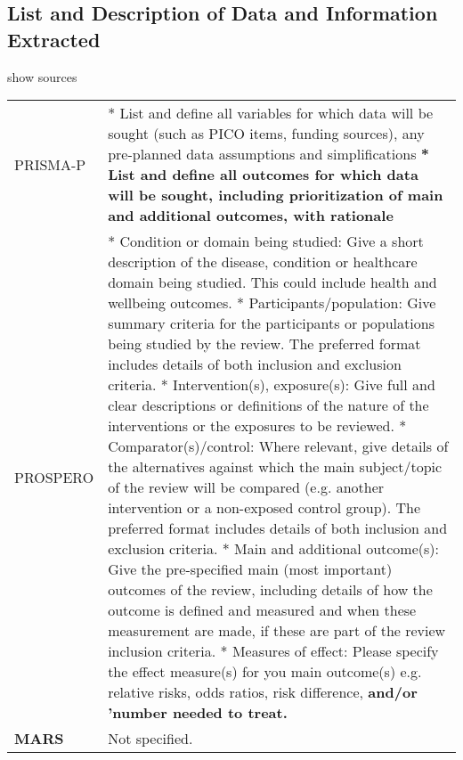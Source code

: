 \documentclass[
]{article}
\begin{document}
\hypertarget{list-and-description-of-data-and-information-extracted}{%
\subsection{List and Description of Data and Information
Extracted}\label{list-and-description-of-data-and-information-extracted}}

show sources

\hypertarget{ladodaie}{}
\begin{collapse}

\begin{table}[H]
\centering
\begin{tabular}{>{}l|l}
\hline
\cellcolor[HTML]{ececec}{source} & \cellcolor[HTML]{ececec}{description}\\
\hline
PRISMA-P & * List and define all variables for which data will be sought (such as PICO items, funding sources), any pre-planned data assumptions and simplifications
\textbf{* List and define all outcomes for which data will be sought, including prioritization of main and additional outcomes, with rationale}\\
\hline
PROSPERO & * Condition or domain being studied: Give a short description of the disease, condition or healthcare domain being studied. This could include health and wellbeing outcomes.
* Participants/population: Give summary criteria for the participants or populations being studied by the review. The preferred format includes details of both inclusion and exclusion criteria.
* Intervention(s), exposure(s): Give full and clear descriptions or definitions of the nature of the interventions or the exposures to be reviewed.
* Comparator(s)/control: Where relevant, give details of the alternatives against which the main subject/topic of the review will be compared (e.g. another intervention or a non-exposed control group). The preferred format includes details of both inclusion and exclusion criteria.
* Main and additional outcome(s): Give the pre-specified main (most important) outcomes of the review, including details of how the outcome is defined and measured and when these measurement are made, if these are part of the review inclusion criteria.
* Measures of effect: Please specify the effect measure(s) for you main outcome(s) e.g. relative risks, odds ratios, risk difference,
\textbf{and/or 'number needed to treat.}\\
\hline
\textbf{MARS} & Not specified.\\
\hline
\end{tabular}
\end{table}

\end{collapse}
\end{document}
